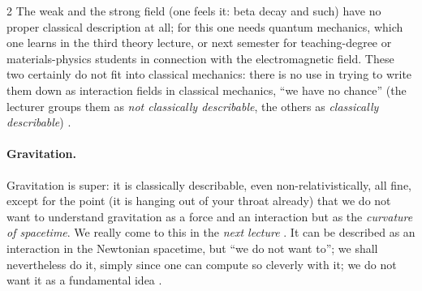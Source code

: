 \begin{paracol}{2}
The weak and the strong field (one feels it: beta decay and such) have no proper classical description at all; for this one needs quantum mechanics, which one learns in the third theory lecture, or next semester for teaching-degree or materials-physics students in connection with the electromagnetic field. These two certainly
do not fit into classical mechanics: there is no use in trying to write them down as interaction fields in classical mechanics, ``we have no chance'' (the lecturer groups them as \emph{not classically describable}, the others as \emph{classically describable}) .

\paragraph{Gravitation.} Gravitation is super: it is classically describable, even non-relativistically, all fine, except for the point (it is hanging out of your throat already) that we do not want to understand gravitation as a force and an interaction but as the \emph{curvature of spacetime}. We
really come to this in the \emph{next lecture} . It can be described as an interaction in the Newtonian spacetime, but ``we do not want to''; we shall nevertheless do it, simply since one can compute so cleverly with it; we do not want it as a fundamental idea
.


\end{paracol}
